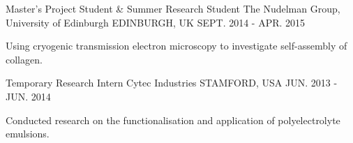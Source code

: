 \begin{cventries}
  \cventry
    {Master's Project Student \& Summer Research Student}
    {The Nudelman Group, University of Edinburgh}
    {EDINBURGH, UK}
    {SEPT. 2014 - APR. 2015}
    {
      \begin{cvitems}
        \item {Using cryogenic transmission electron microscopy to investigate self-assembly of collagen.}
      \end{cvitems}
    }
  \cventry
    {Temporary Research Intern}
    {Cytec Industries}
    {STAMFORD, USA}
    {JUN. 2013 - JUN. 2014}
    {
      \begin{cvitems}
        \item {Conducted research on the functionalisation and application of polyelectrolyte emulsions.}
      \end{cvitems}
    }
\end{cventries}
